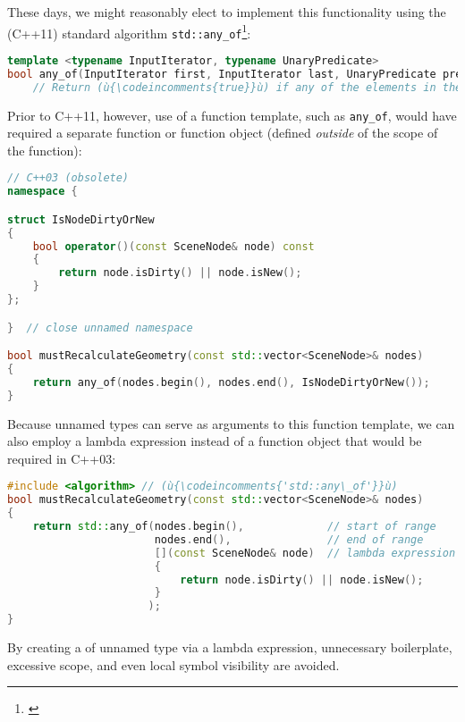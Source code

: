 These days, we might reasonably elect to implement this functionality
using the (C++11) standard algorithm
\lstinline!std::any_of!{\cprotect\footnote{\cite{cppreferencea}}}:

\begin{lstlisting}[language=C++]
template <typename InputIterator, typename UnaryPredicate>
bool any_of(InputIterator first, InputIterator last, UnaryPredicate pred);
    // Return (ù{\codeincomments{true}}ù) if any of the elements in the range satisfies (ù{\codeincomments{pred}}ù).
\end{lstlisting}

\noindent Prior to C++11, however, use of a function template, such as
\lstinline!any_of!, would have required a separate function or
function object (defined \emph{outside} of the scope of the function):

\begin{lstlisting}[language=C++]
// C++03 (obsolete)
namespace {

struct IsNodeDirtyOrNew
{
    bool operator()(const SceneNode& node) const
    {
        return node.isDirty() || node.isNew();
    }
};

}  // close unnamed namespace

bool mustRecalculateGeometry(const std::vector<SceneNode>& nodes)
{
    return any_of(nodes.begin(), nodes.end(), IsNodeDirtyOrNew());
}
\end{lstlisting}

\noindent Because unnamed types can serve as arguments to this function template, we can also employ a lambda expression instead of a function object that would be required in C++03:

\begin{lstlisting}[language=C++]
#include <algorithm> // (ù{\codeincomments{'std::any\_of'}}ù)
bool mustRecalculateGeometry(const std::vector<SceneNode>& nodes)
{
    return std::any_of(nodes.begin(),             // start of range
                       nodes.end(),               // end of range
                       [](const SceneNode& node)  // lambda expression
                       {
                           return node.isDirty() || node.isNew();
                       }
                      );
}
\end{lstlisting}

\noindent By creating a  of unnamed type via a lambda
expression, unnecessary boilerplate, excessive scope, and even local
symbol visibility are avoided.

